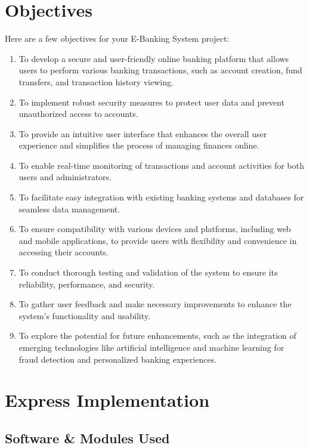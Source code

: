 \chapter{Objectives}

Here are a few objectives for your E-Banking System project:
\begin{enumerate}
    \item To develop a secure and user-friendly online banking platform that allows users to
    perform various banking transactions, such as account creation, fund transfers, and
    transaction history viewing.
    \item To implement robust security measures to protect user data and prevent unauthorized
    access to accounts.
    \item To provide an intuitive user interface that enhances the overall user experience and
    simplifies the process of managing finances online.
    \item To enable real-time monitoring of transactions and account activities for both users
    and administrators.
    \item To facilitate easy integration with existing banking systems and databases for
    seamless data management.
    \item To ensure compatibility with various devices and platforms, including web and
    mobile applications, to provide users with flexibility and convenience in accessing their
    accounts.
    \item To conduct thorough testing and validation of the system to ensure its reliability,
    performance, and security.
    \item To gather user feedback and make necessary improvements to enhance the system's
    functionality and usability.
    \item To explore the potential for future enhancements, such as the integration of
    emerging technologies like artificial intelligence and machine learning for fraud detection
    and personalized banking experiences.
\end{enumerate}


\chapter{Express Implementation}
\section{Software \& Modules Used}

